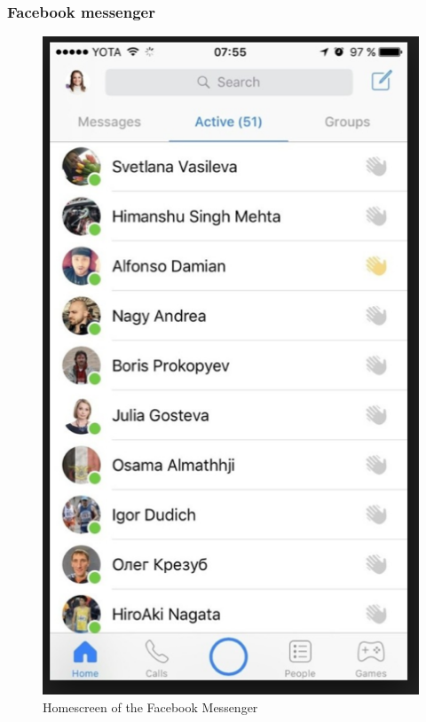 \subsubsection{Facebook messenger}

\begin{figure}[htbp]
\centerline{\includegraphics[width=\linewidth]{./pictures/facebook_friends}}
\caption{Homescreen of the Facebook Messenger}
\label{fig:facebook_friends}
\end{figure}
\FloatBarrier


